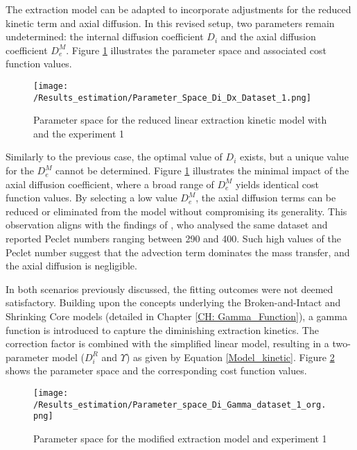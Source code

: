 \documentclass[../Supercritical_fluid_extraction_of_essential_oil_from_chamomile.tex]{subfiles}
\begin{document}
	The extraction model can be adapted to incorporate adjustments for the reduced kinetic term and axial diffusion. In this revised setup, two parameters remain undetermined: the internal diffusion coefficient $D_i$ and the axial diffusion coefficient $D_e^M$. Figure \ref{fig: Fit_1_Di_Dx} illustrates the parameter space and associated cost function values.
	
	\begin{figure}[!h]
		\centering
		\texttt{[image: /Results\_estimation/Parameter\_Space\_Di\_Dx\_Dataset\_1.png]}
		\caption{Parameter space for the reduced linear extraction kinetic model with and the experiment 1}
		\label{fig: Fit_1_Di_Dx}
	\end{figure}
	
	Similarly to the previous case, the optimal value of $D_i$ exists, but a unique value for the $D_e^M$ cannot be determined. Figure \ref{fig: Fit_1_Di_Dx} illustrates the minimal impact of the axial diffusion coefficient, where a broad range of $D_e^M$ yields identical cost function values. By selecting a low value $D_e^M$, the axial diffusion terms can be reduced or eliminated from the model without compromising its generality. This observation aligns with the findings of \citet{Rahimi2011}, who analysed the same dataset and reported Peclet numbers ranging between 290 and 400. Such high values of the Peclet number suggest that the advection term dominates the mass transfer, and the axial diffusion is negligible.
	
	In both scenarios previously discussed, the fitting outcomes were not deemed satisfactory. Building upon the concepts underlying the Broken-and-Intact and Shrinking Core models (detailed in Chapter \ref{CH: Gamma_Function}), a gamma function is introduced to capture the diminishing extraction kinetics. The correction factor is combined with the simplified linear model, resulting in a two-parameter model ($D_i^R$ and $\Upsilon$) as given by Equation \ref{Model_kinetic}. Figure \ref{fig: Fit_1_Di_Gamma} shows the parameter space and the corresponding cost function values.
	
	\begin{figure}[!h]
		\centering
		\texttt{[image: /Results\_estimation/Parameter\_space\_Di\_Gamma\_dataset\_1\_org.png]}
		\caption{Parameter space for the modified extraction model and experiment 1}
		\label{fig: Fit_1_Di_Gamma}
	\end{figure}
	
\end{document}
